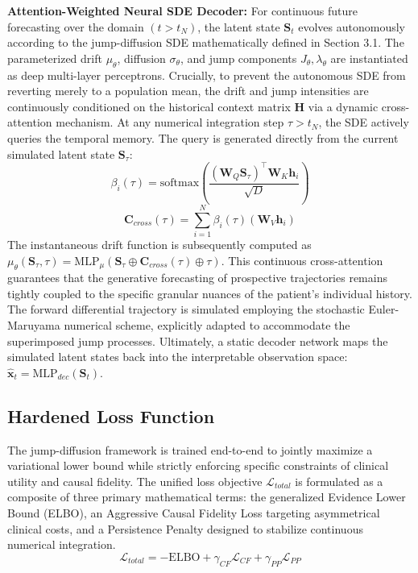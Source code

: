 \textbf{Attention-Weighted Neural SDE Decoder:} For continuous future forecasting over the domain $(t > t_N)$, the latent state $\mathbf{S}_t$ evolves autonomously according to the jump-diffusion SDE mathematically defined in Section 3.1. The parameterized drift $\mu_\theta$, diffusion $\sigma_\theta$, and jump components $J_\theta, \lambda_\theta$ are instantiated as deep multi-layer perceptrons. Crucially, to prevent the autonomous SDE from reverting merely to a population mean, the drift and jump intensities are continuously conditioned on the historical context matrix $\mathbf{H}$ via a dynamic cross-attention mechanism.
At any numerical integration step $\tau > t_N$, the SDE actively queries the temporal memory. The query is generated directly from the current simulated latent state $\mathbf{S}_\tau$:
\begin{equation}
\beta_i(\tau) = \text{softmax} \left( \frac{(\mathbf{W}_Q \mathbf{S}_\tau)^\top \mathbf{W}_K \mathbf{h}_i}{\sqrt{D}} \right)
\end{equation}
\begin{equation}
\mathbf{C}_{cross}(\tau) = \sum_{i=1}^N \beta_i(\tau) (\mathbf{W}_V \mathbf{h}_i)
\end{equation}
The instantaneous drift function is subsequently computed as $\mu_\theta(\mathbf{S}_\tau, \tau) = \text{MLP}_\mu(\mathbf{S}_\tau \oplus \mathbf{C}_{cross}(\tau) \oplus \tau)$. This continuous cross-attention guarantees that the generative forecasting of prospective trajectories remains tightly coupled to the specific granular nuances of the patient's individual history. The forward differential trajectory is simulated employing the stochastic Euler-Maruyama numerical scheme, explicitly adapted to accommodate the superimposed jump processes. Ultimately, a static decoder network maps the simulated latent states back into the interpretable observation space: $\hat{\mathbf{x}}_t = \text{MLP}_{dec}(\mathbf{S}_t)$.

\subsection{Hardened Loss Function}

The jump-diffusion framework is trained end-to-end to jointly maximize a variational lower bound while strictly enforcing specific constraints of clinical utility and causal fidelity. The unified loss objective $\mathcal{L}_{total}$ is formulated as a composite of three primary mathematical terms: the generalized Evidence Lower Bound (ELBO), an Aggressive Causal Fidelity Loss targeting asymmetrical clinical costs, and a Persistence Penalty designed to stabilize continuous numerical integration.
\begin{equation}
\mathcal{L}_{total} = -\text{ELBO} + \gamma_{CF} \mathcal{L}_{CF} + \gamma_{PP} \mathcal{L}_{PP}
\end{equation}

